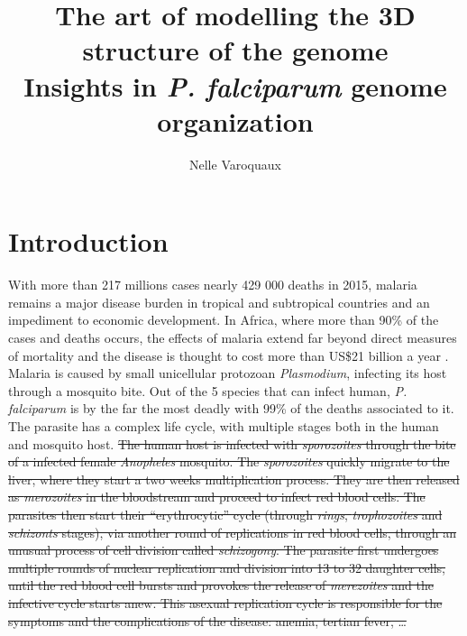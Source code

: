 \documentclass[letterpaper,12pt]{article}
\begin{document}
\title{The art of modelling the 3D structure of the genome\\
  Insights in {\em P. falciparum} genome organization}
\author{Nelle Varoquaux}



\begin{abstract}

\end{abstract}


\section{Introduction}
\label{sec:introduction}

With more than 217 millions cases nearly 429 000 deaths in 2015,  malaria
remains a major disease burden in tropical and subtropical countries and an
impediment to economic development. In Africa, where more than 90\% of the
cases and deaths occurs, the effects of malaria extend far beyond direct
measures of mortality and the disease is thought to cost more than US\$21
billion a year \citep{onwujekwe:do}.
Malaria is caused by small unicellular protozoan {\em Plasmodium}, infecting
its host through a mosquito bite. Out of the 5 species that can infect human,
{\em P. falciparum} is by the far the most deadly with 99\% of the deaths
associated to it. The parasite has a complex life cycle, with multiple stages
both in the human and mosquito host. \sout{The human host is infected with
\textit{sporozoites} through the bite of a infected female  {\em Anopheles}
mosquito. The \textit{sporozoites} quickly migrate to the liver, where they
start a two weeks multiplication process. They are then released as
\textit{merozoites} in the bloodstream and proceed to infect red blood cells. The
parasites then start their ``erythrocytic'' cycle (through \textit{rings},
\textit{trophozoites} and \textit{schizonts} stages), via another round of
replications in red blood cells, through an unusual process of cell division
called \textit{schizogony}. The parasite first undergoes multiple rounds of nuclear
replication and division into 13 to 32 daughter cells, until the red blood
cell bursts and provokes the release of \textit{merezoites} and the infective cycle
starts anew. This asexual replication cycle is responsible for the symptoms
and the complications of the disease: anemia, tertian fever, \dots}
\end{document}
